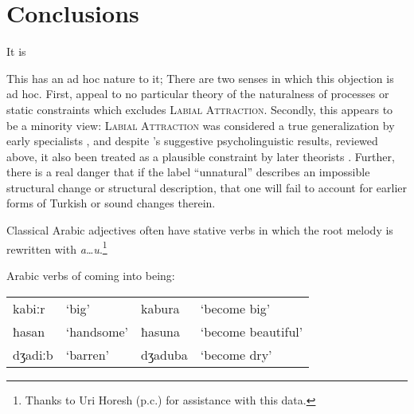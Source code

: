 \section{Conclusions}

\citet{Becker2011}

It is 

This has an ad hoc nature to it; 
There are two senses in which this objection is ad hoc. 
First, \citeauthor{Becker2011} appeal to no particular theory of the naturalness of processes or static constraints which excludes \textsc{Labial Attraction}. 
Secondly, this appears to be a minority view: \textsc{Labial Attraction} was considered a true generalization by early specialists
\citep[e.g.,][]{Lees1966a}, and despite \citeauthor{Zimmer1969}'s suggestive psycholinguistic results, reviewed above, it also been treated as a plausible constraint by later theorists \citep[e.g.,][]{NiChiosain1993,Ito1993,Ito1995a,Zuraw2000}.
Further, there is a real danger that if the label ``unnatural'' 
describes an impossible structural change or structural description, that one will fail to account for earlier forms of Turkish or sound changes therein.

Classical Arabic adjectives often have stative verbs in which the root melody is rewritten with \emph{a\ldots{}u}.\footnote{Thanks to Uri Horesh (p.c.) for assistance with this data.}

\begin{example}
Arabic verbs of coming into being: \\
\begin{tabular}{l l l l}
kabiːr  & `big'        & kabura  & `become big'       \\
ħasan   & `handsome'   & ħasuna  & `become beautiful' \\
dʒadiːb & `barren'     & dʒaduba & `become dry'       \\
\end{tabular}
\end{example}

 
